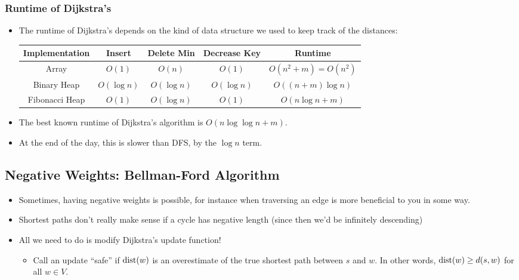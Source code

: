 	\subsubsection{Runtime of Dijkstra's}
	\begin{itemize}
		\item The runtime of Dijkstra's depends on the kind of data structure we used to keep track 
			of the distances:
			\begin{center}
				\begin{tabular}{c|c|c|c|c}
					\textbf{Implementation} & \textbf{Insert} & \textbf{Delete Min} & 
					\textbf{Decrease Key} & \textbf{Runtime}\\
					\hline 
					Array & $O(1)$ & $O(n)$ & $O(1)$ & $O(n^2 + m) = O(n^2)$\\
					Binary Heap & $O(\log n)$ & $O(\log n)$ & $O(\log n)$ & $O((n + m) \log n)$\\
					Fibonacci Heap & $O(1)$ & $O(\log n)$ & $O(1)$ & $O(n \log n + m)$
				\end{tabular}
			\end{center}
		\item The best known runtime of Dijkstra's algorithm is $O(n \log \log n + m)$.
		\item At the end of the day, this is slower than DFS, by the $\log n$ term.
	\end{itemize}
	
	\subsection{Negative Weights: Bellman-Ford Algorithm}
	\begin{itemize}
		\item Sometimes, having negative weights is possible, for instance when traversing an edge is more 
			beneficial to you in some way.
		\item Shortest paths don't really make sense if a cycle has negative length (since then we'd be 
			infinitely descending) 
		\item All we need to do is modify Dijkstra's update function!
			\begin{itemize}
				\item Call an update ``safe'' if $\mathrm{dist}(w)$ is an overestimate of the true shortest path 
					between $s$ and $w$. In other words, $\mathrm{dist}(w) \ge d(s, w)$ for all $w \in V$. 
			\end{itemize}
	\end{itemize}

